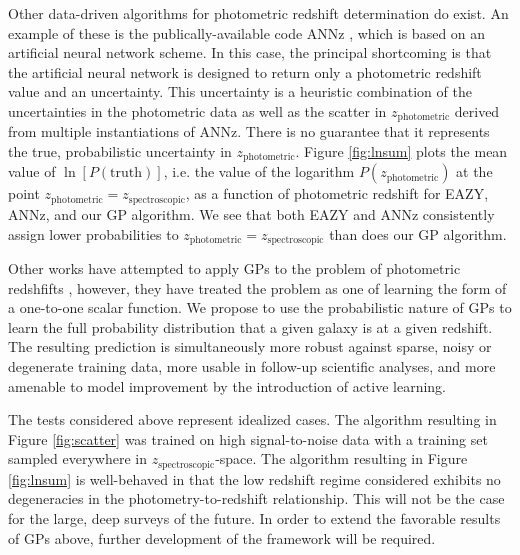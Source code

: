 \documentclass[prd,nofootbib,floatfix,11pt,tightenlines,nofootinbib]{revtex4}
\begin{document}
Other data-driven algorithms for photometric redshift determination do exist. 
An example of these is the publically-available code ANNz \cite{annz},
which is based on an artificial neural network scheme.
In this case, the principal
shortcoming  is that the artificial neural network
is designed to return only a
photometric redshift value and an uncertainty.
This uncertainty is a heuristic combination of the uncertainties in the
photometric data as well as the scatter in $z_\text{photometric}$ derived
from multiple instantiations of ANNz.  There is no guarantee that it represents
the true, probabilistic uncertainty in $z_\text{photometric}$.
Figure \ref{fig:lnsum} plots the mean value of $\ln[P(\text{truth})]$,
i.e. the value of the logarithm $P(z_\text{photometric})$ at the point
$z_\text{photometric}=z_\text{spectroscopic}$, 
as a function
of photometric redshift for EAZY, ANNz, and our GP algorithm.
We see that both EAZY and ANNz consistently assign lower probabilities to
$z_\text{photometric}=z_\text{spectroscopic}$ than does our GP algorithm.

Other works have attempted to apply GPs to the problem of
photometric redshfifts \cite{kaufman,bonfield}, however, they have treated
the problem as one of learning the form of a one-to-one scalar function.
We propose to use the probabilistic nature of GPs to learn the full
probability distribution that a given galaxy is at a given redshift.  The
resulting prediction is simultaneously more robust against sparse, noisy or
degenerate training data, more usable in follow-up scientific analyses, and
more amenable to model improvement by the introduction of active learning.


The tests considered above represent idealized cases.
The algorithm resulting in Figure \ref{fig:scatter} was trained on high
signal-to-noise data with a training set sampled everywhere in
$z_\text{spectroscopic}$-space.  The algorithm resulting in Figure
\ref{fig:lnsum} is well-behaved in that the low redshift regime considered
exhibits no degeneracies in the photometry-to-redshift relationship.  This will
not be the case for the large, deep surveys of the future.  In order to extend
the favorable results of GPs above, further development of the
framework will be required.
\end{document}
